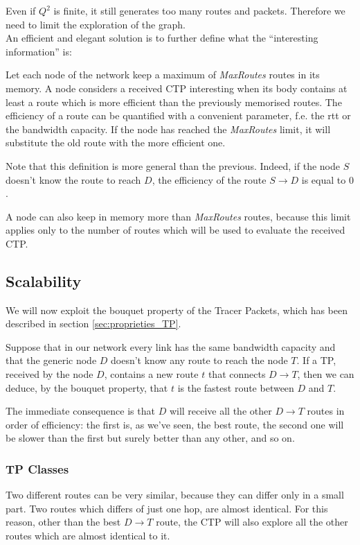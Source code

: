 \documentclass[a4paper]{article}
\begin{document}
Even if $Q^2$ is finite, it still generates too many routes and packets.
Therefore we need to limit the exploration of the graph.\\
An efficient and elegant solution is to further define what the ``interesting
information'' is:

Let each node of the network keep a maximum of \emph{MaxRoutes} routes in
its memory. A node considers a received CTP interesting when its body contains
at least a route which is more efficient than the previously memorised routes.
The efficiency of a route can be quantified with a convenient parameter, f.e.
the rtt or the bandwidth capacity.
If the node has reached the \emph{MaxRoutes} limit, it will substitute the old
route with the more efficient one.

Note that this definition is more general than the previous. Indeed, if the
node $S$ doesn't know the route to reach $D$, the efficiency of the route $S
\rightarrow D$ is equal to $0$.

A node can also keep in memory more than \emph{MaxRoutes} routes, because this
limit applies only to the number of routes which will be used to evaluate the
received CTP.

\subsection{Scalability}
\label{sec:Scalability}
We will now exploit the bouquet property of the Tracer Packets, which has
been described in section \ref{sec:proprieties_TP}.

Suppose that in our network every link has the same bandwidth capacity and
that the generic node $D$ doesn't know any route to reach the
node $T$.
If a TP, received by the node $D$, contains a new route $t$ that
connects $D \rightarrow T$, then we can deduce, by the bouquet property, that
$t$ is the fastest route between $D$ and $T$.

The immediate consequence is that $D$ will receive all the other $D
\rightarrow T$ routes in order of efficiency: the first is, as we've seen,
the best route, the second one will be slower than the first but surely
better than any other, and so on.


\subsubsection{TP Classes}
\label{sec:tp_classes}
Two different routes can be very similar, because they can differ only in a
small part. Two routes which differs of just one hop, are almost identical.
For this reason, other than the best $D \rightarrow  T$ route, the CTP will
also explore all the other routes which are almost identical to it.
\end{document}
